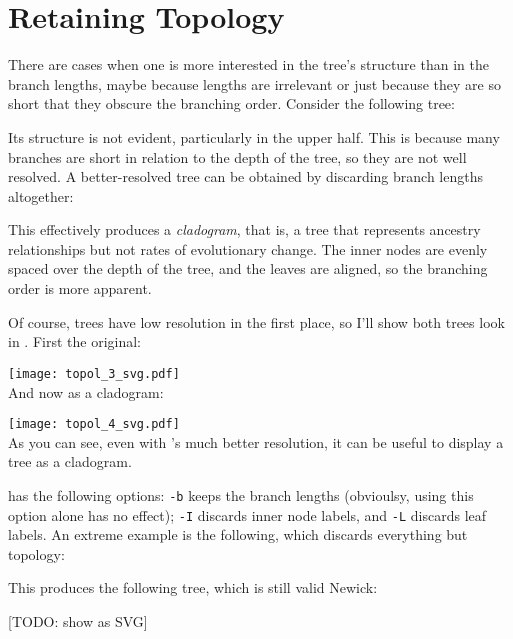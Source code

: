 \section{Retaining Topology}
\label{sct_topology}

There are cases when one is more interested in the tree's structure than in the
branch lengths, maybe because lengths are irrelevant or just because they are
so short that they obscure the branching order. Consider the following tree:
\begin{samepage}

\end{samepage}
Its structure is not evident, particularly in the upper half. This is because
many branches are short in relation to the depth of the tree, so they are not
well resolved. A better-resolved tree can be obtained by discarding branch
lengths altogether:

\begin{samepage}

\end{samepage}
This effectively produces a \emph{cladogram}, that is, a tree that represents
ancestry relationships but not rates of evolutionary change. The inner nodes are
evenly spaced over the depth of the tree, and the leaves are aligned, so the
branching order is more apparent.

Of course, \ascii{} trees have low resolution in the first place, so I'll show
both trees look in \svg. First the original: 

\texttt{[image: topol\_3\_svg.pdf]} \\

\noindent{}And now as a cladogram:

\texttt{[image: topol\_4\_svg.pdf]} \\
As you can see, even with \svg{}'s much better resolution, it can be useful to
display a tree as a cladogram.

\topology{} has the following options: \texttt{-b} keeps the branch lengths (obvioulsy, using this option alone has no effect); \texttt{-I} discards inner node labels, and \texttt{-L} discards leaf labels. An extreme example is the following, which discards everything but topology:

This produces the following tree, which is still valid Newick:

[TODO: show as SVG]


